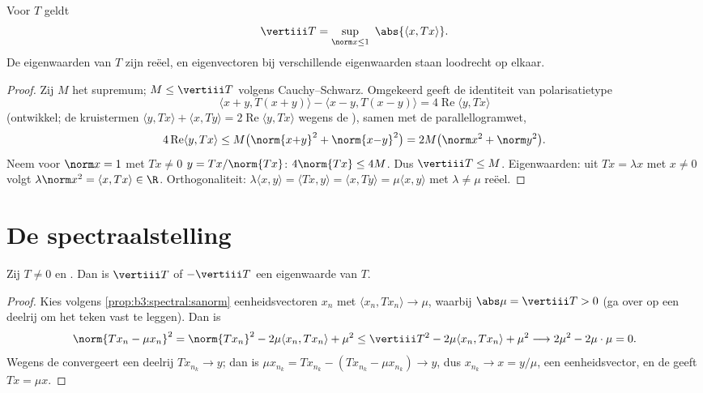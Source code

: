 \begin{proposition}\label{prop:b3:spectral:sanorm}
Voor  $T$ geldt
\[
\vertiii T = \sup_{\norm x \leq 1}\ \abs{\langle x,
Tx\rangle} .
\]
De eigenwaarden van $T$ zijn reëel, en eigenvectoren bij
verschillende eigenwaarden staan loodrecht op elkaar.
\end{proposition}

\begin{proof}
Zij $M$ het supremum; $M \leq \vertiii T$ volgens
Cauchy--Schwarz. Omgekeerd geeft de identiteit van
polarisatietype
\[
\langle x{+}y, T(x{+}y)\rangle - \langle x{-}y,
T(x{-}y)\rangle = 4\operatorname{Re}\langle y, Tx\rangle
\]
(ontwikkel; de kruistermen $\langle y, Tx\rangle + \langle x,
Ty\rangle = 2\operatorname{Re}\langle y, Tx\rangle$ wegens de
), samen met de parallellogramwet,
\[
4\operatorname{Re}\langle y, Tx\rangle \leq
M\bigl(\norm{x{+}y}^2 + \norm{x{-}y}^2\bigr) = 2M\bigl(\norm
x^2 + \norm y^2\bigr).
\]
Neem voor $\norm x = 1$ met $Tx \neq 0$ $y = Tx/\norm{Tx}$:
$4\norm{Tx} \leq 4M$. Dus $\vertiii T \leq M$. Eigenwaarden: uit
$Tx = \lambda x$ met $x \ne 0$ volgt $\lambda\norm x^2 = \langle
x, Tx\rangle \in \R$. Orthogonaliteit: $\lambda\langle x,
y\rangle = \langle Tx, y\rangle = \langle x, Ty\rangle =
\mu\langle x, y\rangle$ met $\lambda \neq \mu$ reëel.
\end{proof}

\section{De spectraalstelling}

\begin{lemma}
\label{lem:b3:spectral:existence}
Zij $T \neq 0$  en . Dan is $\vertiii T$ of
$-\vertiii T$ een eigenwaarde van $T$.
\end{lemma}

\begin{proof}
Kies volgens \cref{prop:b3:spectral:sanorm} eenheidsvectoren
$x_n$ met $\langle x_n, Tx_n\rangle \to \mu$, waarbij $\abs\mu =
\vertiii T > 0$ (ga over op een deelrij om het teken vast te
leggen). Dan is
\[
\norm{Tx_n - \mu x_n}^2
= \norm{Tx_n}^2 - 2\mu\langle x_n, Tx_n\rangle + \mu^2
\leq \vertiii T^2 - 2\mu\langle x_n, Tx_n\rangle + \mu^2
\longrightarrow 2\mu^2 - 2\mu\cdot\mu = 0 .
\]
Wegens de  convergeert een deelrij $Tx_{n_k} \to y$;
dan is $\mu x_{n_k} = Tx_{n_k} - (Tx_{n_k} - \mu x_{n_k}) \to y$,
dus $x_{n_k} \to x = y/\mu$, een eenheidsvector, en de
 geeft $Tx = \mu x$.
\end{proof}

